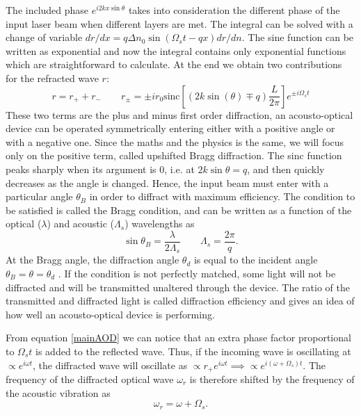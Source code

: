 The included phase $e^{i2kx \sin\theta}$ takes into consideration the different phase of the input laser beam when different layers are met. The integral can be solved with a change of variable $dr/dx = q \Delta n_0 \sin \left(\Omega_s t - qx \right)dr/dn $. The sine function can be written as exponential and now the integral contains only exponential functions which are straightforward to calculate. At the end we obtain two contributions for the refracted wave $r$:
\begin{equation}
\label{mainAOD}
r = r_+ + r_- \qquad r_\pm = \pm i r_0 \text{sinc} \left[(2k\sin(\theta) \mp q)\frac{L}{2\pi} \right]e^{\pm i\Omega_s t}
\end{equation}
These two terms are the plus and minus first order diffraction, an acousto-optical device can be operated symmetrically entering either with a positive angle or with a negative one. Since the maths and the physics is the same, we will focus only on the positive term, called upshifted Bragg diffraction. The sinc function peaks sharply when its argument is 0, i.e. at $2k\sin\theta = q$, and then quickly decreases as the angle is changed. Hence, the input beam must enter with a particular angle $\theta_B$ in order to diffract with maximum efficiency. The condition to be satisfied is called the Bragg condition, and can be written as a function of the optical ($\lambda$) and acoustic ($\Lambda_s$) wavelengths as
\begin{equation}
\label{braggcondition}
\sin \theta_B  = \frac{\lambda}{2 \Lambda_s} \qquad \Lambda_s = \frac{2\pi}{q}.
\end{equation}
At the Bragg angle, the diffraction angle $\theta_d$ is equal to the incident angle $\theta_B = \theta = \theta_d$ \cite{Korpel1981}. If the condition is not perfectly matched, some light will not be diffracted and will be transmitted unaltered through the device. The ratio of the transmitted and diffracted light is called diffraction efficiency and gives an idea of how well an acousto-optical device is performing.\par
From equation \eqref{mainAOD} we can notice that an extra phase factor proportional to $\Omega_s t$ is added to the reflected wave. Thus, if the incoming wave is oscillating at $\propto e^{i\omega t}$, the diffracted wave will oscillate as $\propto r_{+}e^{i\omega t} \implies \propto e^{i(\omega + \Omega_s )t}$. The frequency of the diffracted optical wave $\omega_r$ is therefore shifted by the frequency of the acoustic vibration as
\begin{equation}
\label{eq:aodshift}
\omega_r  =  \omega + \Omega_s.
\end{equation}
